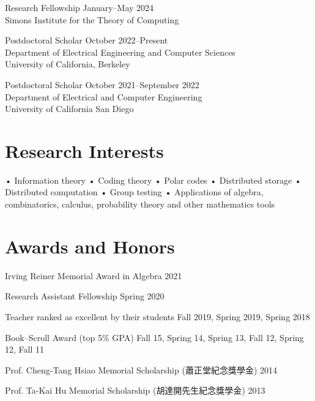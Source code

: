 \documentclass{article}
\begin{document}
Research Fellowship                          \hfill January--May 2024 \\
Simons Institute for the Theory of Computing

Postdoctoral Scholar                     \hfill October 2022--Present \\
Department of Electrical Engineering and Computer Sciences            \\
University of California, Berkeley

Postdoctoral Scholar              \hfill October 2021--September 2022 \\
Department of Electrical and Computer Engineering                     \\
University of California San Diego


\section{Research Interests}

• Information theory
• Coding theory
• Polar codes
• Distributed storage
• Distributed computation
• Group testing
• Applications of algebra, combinatorics, calculus, probability theory
  and other mathematics tools

\section{Awards and Honors}

Irving Reiner Memorial Award in Algebra                      \hfill 2021

Research Assistant Fellowship                         \hfill Spring 2020

Teacher ranked as excellent by their students
                              \hfill Fall 2019, Spring 2019, Spring 2018

Book--Scroll Award (top 5\% GPA)
       \hfill Fall 15, Spring 14, Spring 13, Fall 12, Spring 12, Fall 11

Prof. Cheng-Tang Hsiao Memorial Scholarship ({\zhfamily 蕭正堂紀念獎學金})
                                                             \hfill 2014

Prof. Ta-Kai Hu Memorial Scholarship ({\zhfamily 胡達開先生紀念獎學金})
                                                             \hfill 2013
\end{document}
